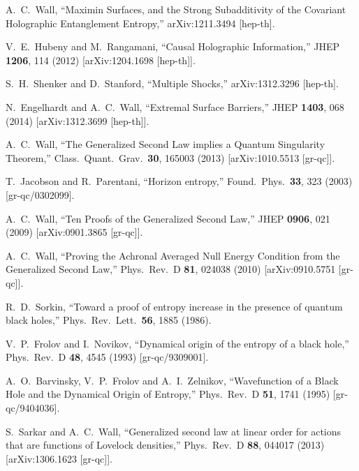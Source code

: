\documentclass[12pt]{article}
\theoremstyle{remark}
\numberwithin{equation}{section}
\numberwithin{equation}{section}
\begin{document}
\begin{thebibliography}{99}
  A.~C.~Wall,
  ``Maximin Surfaces, and the Strong Subadditivity of the Covariant Holographic Entanglement Entropy,''
  arXiv:1211.3494 [hep-th].


  V.~E.~Hubeny and M.~Rangamani,
  ``Causal Holographic Information,''
  JHEP {\bf 1206}, 114 (2012)
  [arXiv:1204.1698 [hep-th]].


  S.~H.~Shenker and D.~Stanford,
  ``Multiple Shocks,''
  arXiv:1312.3296 [hep-th].


  N.~Engelhardt and A.~C.~Wall,
  ``Extremal Surface Barriers,''
  JHEP {\bf 1403}, 068 (2014)
  [arXiv:1312.3699 [hep-th]].


  A.~C.~Wall,
  ``The Generalized Second Law implies a Quantum Singularity Theorem,''
  Class.\ Quant.\ Grav.\  {\bf 30}, 165003 (2013)
  [arXiv:1010.5513 [gr-qc]].


  T.~Jacobson and R.~Parentani,
  ``Horizon entropy,''
  Found.\ Phys.\  {\bf 33}, 323 (2003)
  [gr-qc/0302099].


  A.~C.~Wall,
  ``Ten Proofs of the Generalized Second Law,''
  JHEP {\bf 0906}, 021 (2009)
  [arXiv:0901.3865 [gr-qc]].

  A.~C.~Wall,
  ``Proving the Achronal Averaged Null Energy Condition from the Generalized Second Law,''
  Phys.\ Rev.\ D {\bf 81}, 024038 (2010)
  [arXiv:0910.5751 [gr-qc]].

  R.~D.~Sorkin,
  ``Toward a proof of entropy increase in the presence of quantum black holes,''
  Phys.\ Rev.\ Lett.\  {\bf 56}, 1885 (1986).

  V.~P.~Frolov and I.~Novikov,
  ``Dynamical origin of the entropy of a black hole,''
  Phys.\ Rev.\ D {\bf 48}, 4545 (1993)
  [gr-qc/9309001].

  A.~O.~Barvinsky, V.~P.~Frolov and A.~I.~Zelnikov,
  ``Wavefunction of a Black Hole and the Dynamical Origin of Entropy,''
  Phys.\ Rev.\ D {\bf 51}, 1741 (1995)
  [gr-qc/9404036].

  S.~Sarkar and A.~C.~Wall,
  ``Generalized second law at linear order for actions that are functions of Lovelock densities,''
  Phys.\ Rev.\ D {\bf 88}, 044017 (2013)
  [arXiv:1306.1623 [gr-qc]].


\end{thebibliography}
\end{document}
